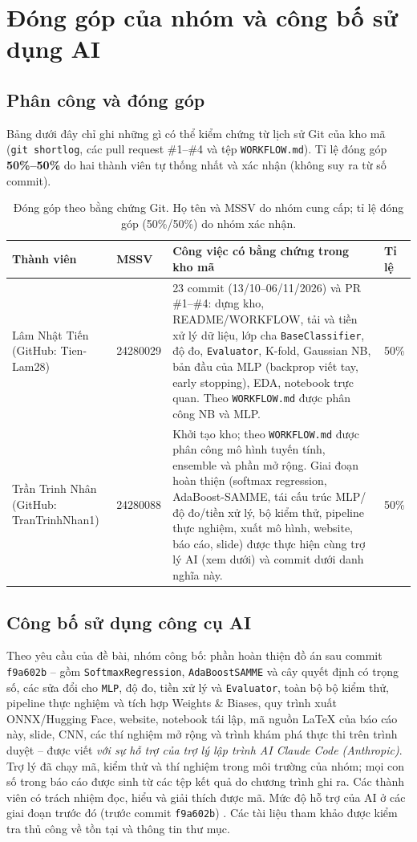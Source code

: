 \section{Đóng góp của nhóm và công bố sử dụng AI}
\label{sec:contrib}

\subsection{Phân công và đóng góp}
Bảng dưới đây chỉ ghi những gì có thể kiểm chứng từ lịch sử Git của kho mã (\texttt{git shortlog}, các pull request \#1--\#4 và tệp \texttt{WORKFLOW.md}). Tỉ lệ đóng góp \textbf{50\%--50\%} do hai thành viên tự thống nhất và xác nhận (không suy ra từ số commit).

\begin{table}[H]
\centering\small
\begin{tabular}{p{3.2cm}p{1.9cm}p{7.5cm}p{1.1cm}}
\toprule
Thành viên & MSSV & Công việc có bằng chứng trong kho mã & Tỉ lệ \\
\midrule
Lâm Nhật Tiến (GitHub: Tien-Lam28) & 24280029 &
23 commit (13/10--06/11/2026) và PR \#1--\#4: dựng kho, README/WORKFLOW, tải và tiền xử lý dữ liệu, lớp cha \texttt{BaseClassifier}, độ đo, \texttt{Evaluator}, K-fold, Gaussian NB, bản đầu của MLP (backprop viết tay, early stopping), EDA, notebook trực quan. Theo \texttt{WORKFLOW.md} được phân công NB và MLP. &
50\% \\
\addlinespace
Trần Trinh Nhân (GitHub: TranTrinhNhan1) & 24280088 &
Khởi tạo kho; theo \texttt{WORKFLOW.md} được phân công mô hình tuyến tính, ensemble và phần mở rộng. Giai đoạn hoàn thiện (softmax regression, AdaBoost-SAMME, tái cấu trúc MLP/độ đo/tiền xử lý, bộ kiểm thử, pipeline thực nghiệm, xuất mô hình, website, báo cáo, slide) được thực hiện cùng trợ lý AI (xem dưới) và commit dưới danh nghĩa này. &
50\% \\
\bottomrule
\end{tabular}
\caption{Đóng góp theo bằng chứng Git. Họ tên và MSSV do nhóm cung cấp; tỉ lệ đóng góp (50\%/50\%) do nhóm xác nhận.}
\end{table}

\subsection{Công bố sử dụng công cụ AI}
Theo yêu cầu của đề bài, nhóm công bố: phần hoàn thiện đồ án sau commit \texttt{f9a602b} -- gồm \texttt{SoftmaxRegression}, \texttt{AdaBoostSAMME} và cây quyết định có trọng số, các sửa đổi cho \texttt{MLP}, độ đo, tiền xử lý và \texttt{Evaluator}, toàn bộ bộ kiểm thử, pipeline thực nghiệm và tích hợp Weights \& Biases, quy trình xuất ONNX/Hugging Face, website, notebook tái lập, mã nguồn LaTeX của báo cáo này, slide, CNN, các thí nghiệm mở rộng và trình khám phá thực thi trên trình duyệt -- được viết \emph{với sự hỗ trợ của trợ lý lập trình AI Claude Code (Anthropic)}. Trợ lý đã chạy mã, kiểm thử và thí nghiệm trong môi trường của nhóm; mọi con số trong báo cáo được sinh từ các tệp kết quả do chương trình ghi ra. Các thành viên có trách nhiệm đọc, hiểu và giải thích được mã. Mức độ hỗ trợ của AI ở các giai đoạn trước đó (trước commit \texttt{f9a602b}) . Các tài liệu tham khảo được kiểm tra thủ công về tồn tại và thông tin thư mục.
